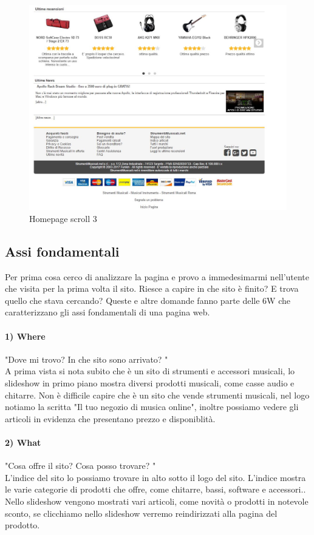 \documentclass[12pt]{article}
\begin{document}
	\begin{figure}
		\centering	
		\includegraphics[width=160mm]{images/home3.png}%
		\caption{Homepage scroll 3}
	\end{figure}
	\newpage
	\subsection{Assi fondamentali}
	\vspace{0.5cm}
	Per prima cosa cerco di analizzare la pagina e provo a immedesimarmi nell'utente che visita per la prima volta il sito. Riesce a capire in che sito è finito? E trova quello che stava cercando?  Queste e altre domande fanno parte delle 6W che caratterizzano gli assi fondamentali di una pagina web.
	\paragraph{1) Where} "Dove mi trovo? In che sito sono arrivato? "
	\\ 
	A prima vista si nota subito che è un sito di strumenti e accessori musicali, lo slideshow in primo piano mostra diversi prodotti musicali, come casse audio e chitarre. Non è difficile capire che è un sito che vende strumenti musicali, nel logo notiamo la scritta "Il tuo negozio di musica online", inoltre possiamo vedere gli articoli in evidenza che presentano prezzo e disponiblità.
	\paragraph{2) What} "Cosa offre il sito? Cosa posso trovare? "
	\\
	L'indice del sito lo possiamo trovare in alto sotto il logo del sito. L'indice mostra le varie categorie di prodotti che offre, come chitarre, bassi, software e accessori.. \\ Nello slideshow vengono mostrati vari articoli, come novità o prodotti in notevole sconto, se clicchiamo nello slideshow verremo reindirizzati alla pagina del prodotto. 
\end{document}
